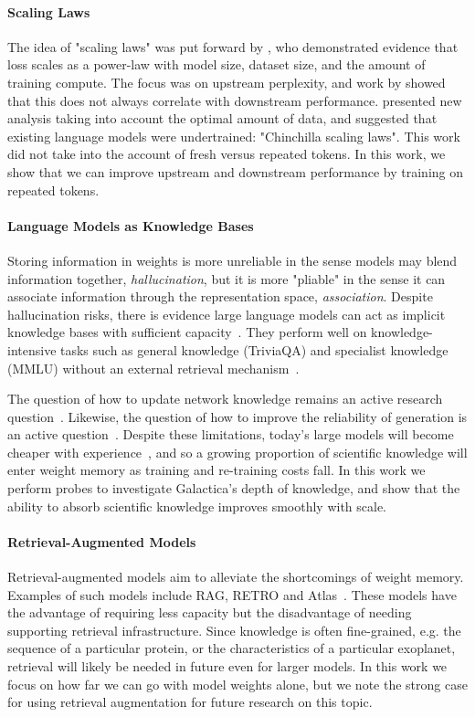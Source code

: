 \paragraph{Scaling Laws}The idea of "scaling laws" was put forward by \citet{ScalingLaws}, who demonstrated evidence that loss scales as a power-law with model size, dataset size, and the amount of training compute. The focus was on upstream perplexity, and work by \citet{ScalingLawsModelArch} showed that this does not always correlate with downstream performance. \citet{Chinchilla} presented new analysis taking into account the optimal amount of data, and suggested that existing language models were undertrained: "Chinchilla scaling laws". This work did not take into the account of fresh versus repeated tokens. In this work, we show that we can improve upstream and downstream performance by training on repeated tokens.

\paragraph{Language Models as Knowledge Bases}Storing information in weights is more unreliable in the sense models may blend information together, \textit{hallucination}, but it is more "pliable" in the sense it can associate information through the representation space, \textit{association}. Despite hallucination risks, there is evidence large language models can act as implicit knowledge bases with sufficient capacity~\citep{petroni2019language}. They perform well on knowledge-intensive tasks such as general knowledge (TriviaQA) and specialist knowledge (MMLU) without an external retrieval mechanism~\citep{GPT3, MMMLU}. 

The question of how to update network knowledge remains an active research question~\citep{ContinualT0, MBMES}. Likewise, the question of how to improve the reliability of generation is an active question~\citep{PostHocResearch}. Despite these limitations, today's large models will become cheaper with experience~\citep{WrightsLaw}, and so a growing proportion of scientific knowledge will enter weight memory as training and re-training costs fall. In this work we perform probes to investigate Galactica's depth of knowledge, and show that the ability to absorb scientific knowledge improves smoothly with scale.

\paragraph{Retrieval-Augmented Models}Retrieval-augmented models aim to alleviate the shortcomings of weight memory. Examples of such models include RAG, RETRO and Atlas~\citep{RAG, RETRO, izacard2022fewshot}. These models have the advantage of requiring less capacity but the disadvantage of needing supporting retrieval infrastructure. Since knowledge is often fine-grained, e.g. the sequence of a particular protein, or the characteristics of a particular exoplanet, retrieval will likely be needed in future even for larger models. In this work we focus on how far we can go with model weights alone, but we note the strong case for using retrieval augmentation for future research on this topic.

